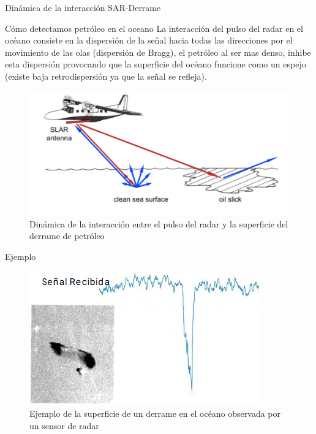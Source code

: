 \begin{frame}{Dinámica de la interacción SAR-Derrame}
  \begin{block}{Cómo detectamos petróleo en el oceano}
    La interacción del pulso del radar en el océano consiste en la dispersión de la señal hacia todas las direcciones por el movimiento de las olas (dispersión de Bragg), el petróleo al ser mas denso, inhibe esta dispersión provocando que la superficie del océano funcione como un espejo (existe baja retrodispersión ya que la señal se refleja).
  \end{block}

    \begin{figure}
        \centering
        \includegraphics[scale=0.2]{img/section_03/sar-petroleo.png}
        \caption{Dinámica de la interacción entre el pulso del radar y la superficie del derrame de petróleo}
        \label{fig:section_03_dinamica_sar_petroleo}
    \end{figure}
\end{frame}

\begin{frame}{Ejemplo}
    \begin{figure}
        \centering
        \includegraphics[scale=0.5]{img/section_03/senal_petroleo}
        \caption{Ejemplo de la superficie de un derrame en el océano observada por un sensor de radar}
        \label{fig:section_03_dinamica_sar_petroleo}
    \end{figure}
\end{frame}

